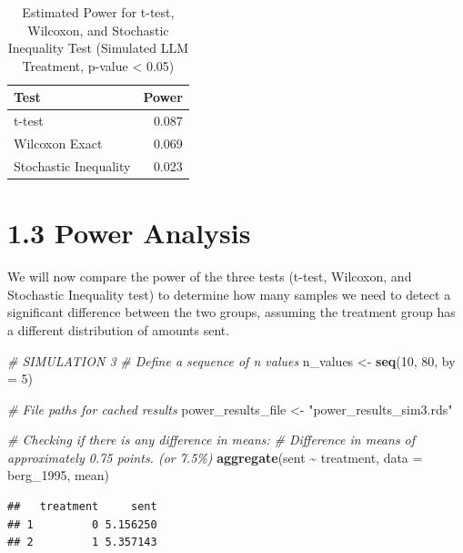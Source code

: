 \documentclass[
]{article}
\newenvironment{Shaded}{\begin{snugshade}}{\end{snugshade}}
\newcommand{\AttributeTok}[1]{\textcolor[rgb]{0.13,0.29,0.53}{#1}}
\newcommand{\CommentTok}[1]{\textcolor[rgb]{0.56,0.35,0.01}{\textit{#1}}}
\newcommand{\DecValTok}[1]{\textcolor[rgb]{0.00,0.00,0.81}{#1}}
\newcommand{\FunctionTok}[1]{\textcolor[rgb]{0.13,0.29,0.53}{\textbf{#1}}}
\newcommand{\NormalTok}[1]{#1}
\newcommand{\OtherTok}[1]{\textcolor[rgb]{0.56,0.35,0.01}{#1}}
\newcommand{\SpecialCharTok}[1]{\textcolor[rgb]{0.81,0.36,0.00}{\textbf{#1}}}
\newcommand{\StringTok}[1]{\textcolor[rgb]{0.31,0.60,0.02}{#1}}
\begin{document}
\begin{table}

\caption{\label{tab:2}Estimated Power for t-test, Wilcoxon, and Stochastic Inequality Test (Simulated LLM Treatment, p-value < 0.05)}
\centering
\begin{tabular}[t]{lr}
\toprule
Test & Power\\
\midrule
t-test & 0.087\\
Wilcoxon Exact & 0.069\\
Stochastic Inequality & 0.023\\
\bottomrule
\end{tabular}
\end{table}

\section{1.3 Power Analysis}\label{power-analysis}

We will now compare the power of the three tests (t-test, Wilcoxon, and
Stochastic Inequality test) to determine how many samples we need to
detect a significant difference between the two groups, assuming the
treatment group has a different distribution of amounts sent.

\begin{Shaded}
\begin{Highlighting}[]
\CommentTok{\# SIMULATION 3}
\CommentTok{\# Define a sequence of n values}
\NormalTok{n\_values }\OtherTok{\textless{}{-}} \FunctionTok{seq}\NormalTok{(}\DecValTok{10}\NormalTok{, }\DecValTok{80}\NormalTok{, }\AttributeTok{by =} \DecValTok{5}\NormalTok{)}

\CommentTok{\# File paths for cached results}
\NormalTok{power\_results\_file }\OtherTok{\textless{}{-}} \StringTok{"power\_results\_sim3.rds"}

\CommentTok{\# Checking if there is any difference in means:}
\CommentTok{\# Difference in means of approximately 0.75 points. (or 7.5\%)}
\FunctionTok{aggregate}\NormalTok{(sent }\SpecialCharTok{\textasciitilde{}}\NormalTok{ treatment, }\AttributeTok{data =}\NormalTok{ berg\_1995, mean)}
\end{Highlighting}
\end{Shaded}

\begin{verbatim}
##   treatment     sent
## 1         0 5.156250
## 2         1 5.357143
\end{verbatim}
\end{document}
